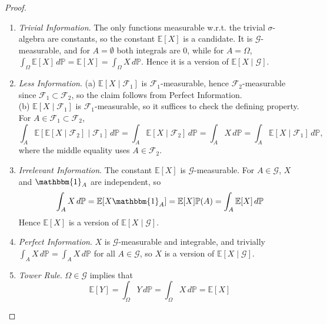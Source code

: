 	\begin{proof}
	  \begin{enumerate}
	    \item \textit{Trivial Information}. The only functions measurable w.r.t. the trivial $\sigma$-algebra are constants, so the constant $\mathbb{E}[X]$ is a candidate. It is $\mathcal{G}$-measurable, and for $A = \emptyset$ both integrals are $0$, while for $A = \Omega$, $\int_\Omega \mathbb{E}[X] \,d\mathbb{P} = \mathbb{E}[X] = \int_\Omega X \,d\mathbb{P}$. Hence it is a version of $\mathbb{E}[X \mid \mathcal{G}]$. 
	    \item \textit{Less Information}. (a) $\mathbb{E}[X \mid \mathcal{F}_1]$ is $\mathcal{F}_1$-measurable, hence $\mathcal{F}_2$-measurable since $\mathcal{F}_1 \subset \mathcal{F}_2$, so the claim follows from Perfect Information. \\
	    (b) $\mathbb{E}[X \mid \mathcal{F}_1]$ is $\mathcal{F}_1$-measurable, so it suffices to check the defining property. For $A \in \mathcal{F}_1 \subset \mathcal{F}_2$, 
	    \begin{equation}
	      \int_A \mathbb{E}[\mathbb{E}[X \mid \mathcal{F}_2] \mid \mathcal{F}_1] \,d\mathbb{P} = \int_A \mathbb{E}[X \mid \mathcal{F}_2] \,d\mathbb{P} = \int_A X \,d\mathbb{P} = \int_A \mathbb{E}[X \mid \mathcal{F}_1] \,d\mathbb{P}, 
	    \end{equation}
	    where the middle equality uses $A \in \mathcal{F}_2$. 
	    \item \textit{Irrelevant Information}. The constant $\mathbb{E}[X]$ is $\mathcal{G}$-measurable. For $A \in \mathcal{G}$, $X$ and $\mathbbm{1}_A$ are independent, so 
	    \begin{equation}
	      \int_A X \,d\mathbb{P} = \mathbb{E}[X \mathbbm{1}_A] = \mathbb{E}[X] \mathbb{P}(A) = \int_A \mathbb{E}[X] \,d\mathbb{P}
	    \end{equation}
	    Hence $\mathbb{E}[X]$ is a version of $\mathbb{E}[X \mid \mathcal{G}]$. 
	    \item \textit{Perfect Information}. $X$ is $\mathcal{G}$-measurable and integrable, and trivially $\int_A X \,d\mathbb{P} = \int_A X \,d\mathbb{P}$ for all $A \in \mathcal{G}$, so $X$ is a version of $\mathbb{E}[X \mid \mathcal{G}]$. 
	    \item \textit{Tower Rule}. $\Omega \in \mathcal{G}$ implies that 
	    \begin{equation}
	      \mathbb{E}[Y] = \int_\Omega Y \,d\mathbb{P} = \int_{\Omega} X \,d\mathbb{P} = \mathbb{E}[X]
	    \end{equation}

\end{enumerate}
\end{proof}
